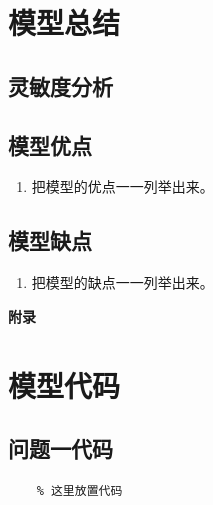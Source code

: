 \documentclass{cumcm}
\begin{document}
\section{模型总结}
\subsection{灵敏度分析}
\subsection{模型优点}
\begin{enumerate}
	\item 把模型的优点一一列举出来。
\end{enumerate}

\subsection{模型缺点}
\begin{enumerate}
	\item 把模型的缺点一一列举出来。
\end{enumerate}



\newpage
\appendix
\textbf{附录}
\section{模型代码}
\subsection{问题一代码}
\begin{lstlisting}
	% 这里放置代码
\end{lstlisting}
\end{document}
